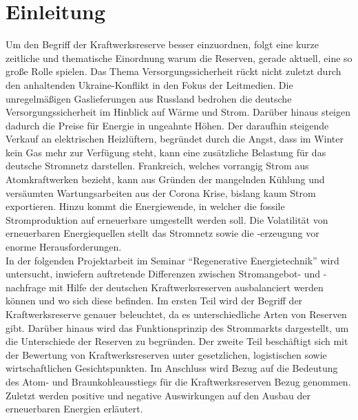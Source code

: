 \section{Einleitung}

	Um den Begriff der Kraftwerksreserve besser einzuordnen, folgt eine kurze zeitliche und thematische Einordnung warum die Reserven, gerade aktuell, eine so große Rolle spielen.
	Das Thema Versorgungssicherheit rückt nicht zuletzt durch den anhaltenden Ukraine-Konflikt in den Fokus der Leitmedien.
	Die unregelmäßigen Gaslieferungen aus Russland bedrohen die deutsche Versorgungssicherheit im Hinblick auf Wärme und Strom.
	Darüber hinaus steigen dadurch die Preise für Energie in ungeahnte Höhen.
	Der daraufhin steigende Verkauf an elektrischen Heizlüftern, begründet durch die Angst, dass im Winter kein Gas mehr zur Verfügung steht, kann eine zusätzliche Belastung für das deutsche Stromnetz darstellen.
	Frankreich, welches vorrangig Strom aus Atomkraftwerken bezieht, kann aus Gründen der mangelnden Kühlung und versäumten Wartungsarbeiten aus der Corona Krise, bislang kaum Strom exportieren.
	Hinzu kommt die Energiewende, in welcher die fossile Stromproduktion auf erneuerbare umgestellt werden soll. 
	Die Volatilität von erneuerbaren Energiequellen stellt das Stromnetz sowie die -erzeugung vor enorme Herausforderungen. \\
	
	In der folgenden Projektarbeit im Seminar "`Regenerative Energietechnik"' wird untersucht, inwiefern auftretende Differenzen zwischen Stromangebot- und -nachfrage mit Hilfe der deutschen Kraftwerksreserven ausbalanciert werden können und wo sich diese befinden.
	Im ersten Teil wird der Begriff der Kraftwerksreserve genauer beleuchtet, da es unterschiedliche Arten von Reserven gibt.
	Darüber hinaus wird das Funktionsprinzip des Strommarkts dargestellt, um die Unterschiede der Reserven zu begründen.
	Der zweite Teil beschäftigt sich mit der Bewertung von Kraftwerksreserven unter gesetzlichen, logistischen sowie wirtschaftlichen Gesichtspunkten.
	Im Anschluss wird Bezug auf die Bedeutung des Atom- und Braunkohleausstiegs für die Kraftwerksreserven Bezug genommen.	
	Zuletzt werden positive und negative Auswirkungen auf den Ausbau der erneuerbaren Energien erläutert.
	
	
	
	
	\clearpage